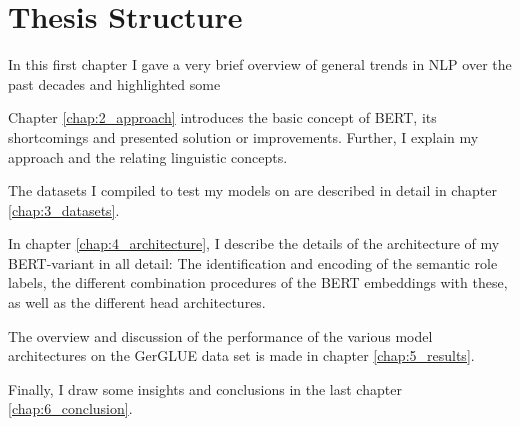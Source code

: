 \section{Thesis Structure}

In this first chapter I gave a very brief overview of general trends in
NLP over the past decades and highlighted some

Chapter \ref{chap:2_approach} introduces the basic concept of BERT,
its {\color{red} shortcomings} and presented solution or improvements. Further,
I explain my approach and the relating linguistic concepts.

The datasets I compiled to test my models on are described in detail
in chapter \ref{chap:3_datasets}.

In chapter \ref{chap:4_architecture}, I describe the details of the architecture of
my BERT-variant in all detail: The identification and encoding of the semantic role
labels, the different combination procedures of the BERT embeddings with these, as
well as the different head architectures.

The overview and discussion of the performance of the various model architectures on
the GerGLUE data set is made in chapter \ref{chap:5_results}.

Finally, I draw some insights and conclusions in the last chapter \ref{chap:6_conclusion}.

